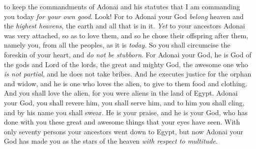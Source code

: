 \begin{biblechapter}
\verse to keep the commandments of Adonai and his statutes that I am commanding you today \textit{for your own good}.
\verse Look! For to Adonai your God \textit{belong} heaven and the \textit{highest heavens}, the earth and all that is in it.
\verse \textit{Yet} to your ancestors Adonai was very attached, so as to love them, and so he chose their offspring after them, namely you, from all the peoples, as it is \textit{today}.
\verse So you shall circumcise the foreskin of your heart, and \textit{do not be stubborn}.
\verse For Adonai your God, he is God of the gods and Lord of the lords, the great and mighty God, the awesome one who \textit{is not partial}, and he does not take bribes.
\verse And he executes justice for the orphan and widow, and he is one who loves the alien, to give to them food and clothing.
\verse And you shall love the alien, for you were aliens in the land of Egypt.
\verse Adonai your God, you shall revere him, you shall serve him, and to him you shall cling, and by his name you shall swear.
\verse He is your praise, and he is your God, who has done with you these great and awesome things that your eyes have seen.
\verse With only seventy persons your ancestors went down to Egypt, but now Adonai your God has made you as the stars of the heaven \textit{with respect to multitude}.
\end{biblechapter}

